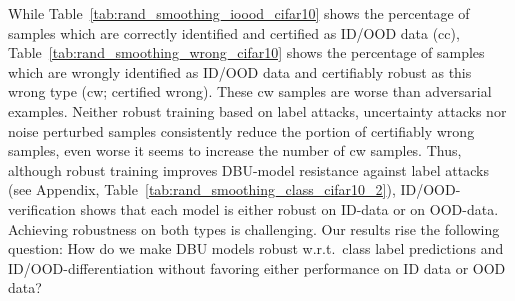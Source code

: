 While Table~\ref{tab:rand_smoothing_ioood_cifar10} shows the percentage of samples which are correctly identified and certified as ID/OOD data (cc), Table~\ref{tab:rand_smoothing_wrong_cifar10} shows the percentage of samples which are wrongly identified as ID/OOD data and certifiably robust as this wrong type (cw; certified wrong). These cw samples are worse than adversarial examples. 
Neither robust training based on label attacks, uncertainty attacks nor noise perturbed samples consistently reduce the portion of certifiably wrong samples, even worse it seems to increase the number of cw samples. 
Thus, although robust training improves DBU-model resistance against label attacks (see Appendix, Table~\ref{tab:rand_smoothing_class_cifar10_2}), ID/OOD-verification shows that each model is either robust on ID-data or on OOD-data. Achieving robustness on both types is challenging. 
Our results rise the following question: How do we make DBU models robust w.r.t.\ class label predictions and ID/OOD-differentiation without favoring either performance on ID data or OOD data? 


